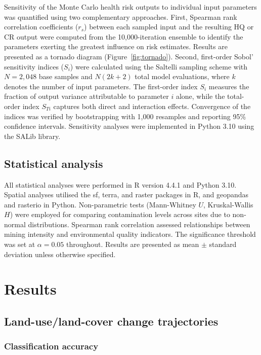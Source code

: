 \documentclass[preprint,12pt,number]{elsarticle}
\begin{document}
Sensitivity of the Monte Carlo health risk outputs to individual input parameters was quantified using two complementary approaches. First, Spearman rank correlation coefficients ($r_s$) between each sampled input and the resulting HQ or CR output were computed from the 10,000-iteration ensemble to identify the parameters exerting the greatest influence on risk estimates. Results are presented as a tornado diagram (Figure~\ref{fig:tornado}). Second, first-order Sobol' sensitivity indices ($S_i$) were calculated using the Saltelli sampling scheme with $N = 2{,}048$ base samples and $N(2k + 2)$ total model evaluations, where $k$ denotes the number of input parameters. The first-order index $S_i$ measures the fraction of output variance attributable to parameter $i$ alone, while the total-order index $S_{Ti}$ captures both direct and interaction effects. Convergence of the indices was verified by bootstrapping with 1,000 resamples and reporting 95\% confidence intervals. Sensitivity analyses were implemented in Python 3.10 using the SALib library.


\subsection{Statistical analysis}

All statistical analyses were performed in R version 4.4.1 \cite{RCoreTeam2024} and Python 3.10. Spatial analyses utilised the sf, terra, and raster packages in R, and geopandas and rasterio in Python. Non-parametric tests (Mann-Whitney $U$, Kruskal-Wallis $H$) were employed for comparing contamination levels across sites due to non-normal distributions. Spearman rank correlation assessed relationships between mining intensity and environmental quality indicators. The significance threshold was set at $\alpha = 0.05$ throughout. Results are presented as mean $\pm$ standard deviation unless otherwise specified.


\section{Results}

\subsection{Land-use/land-cover change trajectories}

\subsubsection{Classification accuracy}
\end{document}
